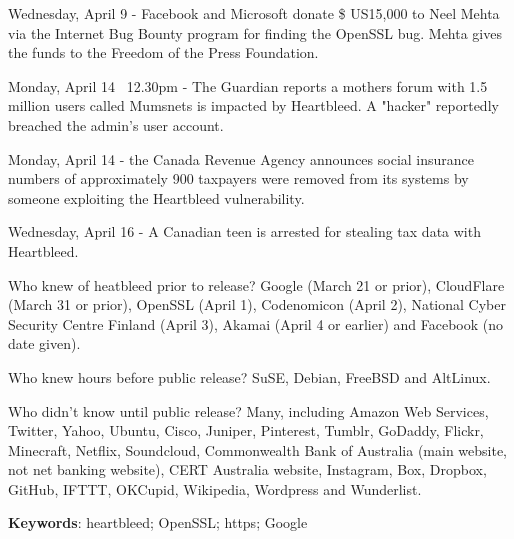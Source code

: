 Wednesday, April 9 - Facebook and Microsoft donate \$ US15,000 to Neel Mehta via the Internet Bug Bounty program for finding the OpenSSL bug. Mehta gives the funds to the Freedom of the Press Foundation.

Monday, April 14 ~12.30pm - The Guardian reports a mothers forum with 1.5 million users called Mumsnets is impacted by Heartbleed. A "hacker" reportedly breached the admin's user account.

Monday, April 14 - the Canada Revenue Agency announces social insurance numbers of approximately 900 taxpayers were removed from its systems by someone exploiting the Heartbleed vulnerability.

Wednesday, April 16 - A Canadian teen is arrested for stealing tax data with Heartbleed.

Who knew of heatbleed prior to release? Google (March 21 or prior), CloudFlare (March 31 or prior), OpenSSL (April 1), Codenomicon (April 2), National Cyber Security Centre Finland (April 3), Akamai (April 4 or earlier) and Facebook (no date given).

Who knew hours before public release? SuSE, Debian, FreeBSD and AltLinux.

Who didn't know until public release? Many, including Amazon Web Services, Twitter, Yahoo, Ubuntu, Cisco, Juniper, Pinterest, Tumblr, GoDaddy, Flickr, Minecraft, Netflix, Soundcloud, Commonwealth Bank of Australia (main website, not net banking website), CERT Australia website, Instagram, Box, Dropbox, GitHub, IFTTT, OKCupid, Wikipedia, Wordpress and Wunderlist.


\vspace{1cm}
\textbf{Keywords}: heartbleed; OpenSSL; https; Google

